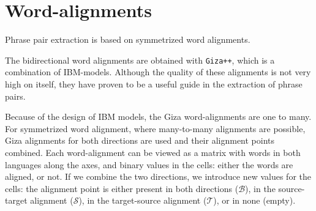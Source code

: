 \documentclass[11pt]{article}
\begin{document}



\section{Word-alignments}
Phrase pair extraction is based on symmetrized word alignments. 

The bidirectional word alignments are obtained with {\tt Giza++}, which is a combination of IBM-models. Although the quality of these alignments is not very high on itself, they have proven to be a useful guide in the extraction of phrase pairs. 


 Because of the design of IBM models, the Giza word-alignments are one to many. For symmetrized word alignment, where many-to-many alignments are possible, Giza alignments for both directions are used and their alignment points combined. Each word-alignment can be viewed as a matrix with words in both languages along the axes, and binary values in the cells: either the words are aligned, or not. If we combine the two directions, we introduce new values for the cells: the alignment point is either present in both directions ($\mathcal B$), in the source-target alignment ($\mathcal S$), in the target-source alignment ($\mathcal T$), or in none (empty).
\end{document}
